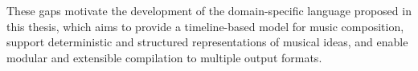 These gaps motivate the development of the domain-specific language proposed in this thesis, which aims to
provide a timeline-based model for music composition, support deterministic and structured representations of musical
ideas, and enable modular and extensible compilation to multiple output formats.
